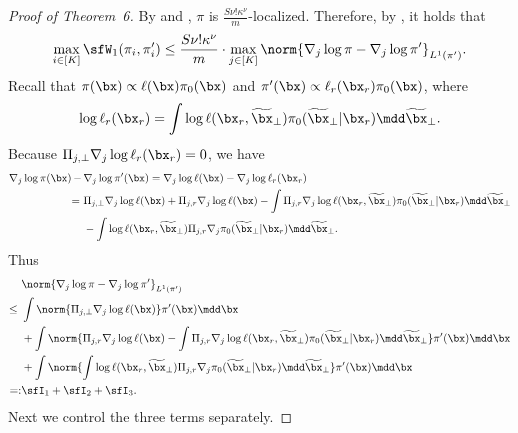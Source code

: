 \documentclass[11pt]{article}
\begin{document}
\begin{proof}[Proof of Theorem~6]

By  and , $\pi$ is $\frac{S\nu! \kappa^\nu}{m}$-localized.
Therefore, by , it holds that 
\[
    \max_{i \in [K]} \sfW_1(\pi_i,\pi_i') \le \frac{S\nu! \kappa^\nu}{m} \cdot \max_{j \in [K]} \norm{ \nabla_j \log \pi - \nabla_j \log \pi' }_{L^1(\pi')}.
\]
Recall that $\pi(\bx) \propto \ell(\bx) \pi_0(\bx)$ and $\pi'(\bx) \propto \ell_r(\bx_r) \pi_0(\bx)$, where
\[
    \log \ell_r(\bx_r) = \int \log \ell(\bx_r,\widetilde{\bx}_\bot) \pi_0(\widetilde{\bx}_\bot|\bx_r) \mdd \widetilde{\bx}_\bot.
\]
Because $\Pi_{j,\bot}\nabla_j \log \ell_r(\bx_r)=0$, we have
\begin{align*}
    \nabla_j \log \pi (\bx) \,-\, &\nabla_j \log \pi' (\bx) = \nabla_j \log \ell (\bx) - \nabla_j \log \ell_r (\bx_r) \\
    =~& \Pi_{j,\bot} \nabla_j \log \ell (\bx) + \Pi_{j,r} \nabla_j \log \ell (\bx) - \int \Pi_{j,r} \nabla_j \log \ell(\bx_r,\widetilde{\bx}_\bot) \pi_0(\widetilde{\bx}_\bot|\bx_r) \mdd \widetilde{\bx}_\bot \\
    &- \int \log \ell(\bx_r,\widetilde{\bx}_\bot) \Pi_{j,r} \nabla_j \pi_0(\widetilde{\bx}_\bot|\bx_r) \mdd \widetilde{\bx}_\bot. 
\end{align*}
Thus
\begin{equation}
\label{eqn:pf_LLIS_err_decomp}
\begin{split}
    &\norm{ \nabla_j \log \pi - \nabla_j \log \pi' }_{L^1(\pi')} \\
    \le~& \int \norm{ \Pi_{j,\bot} \nabla_j \log \ell (\bx) } \pi'(\bx) \mdd \bx \\
    &+ \int \norm{ \Pi_{j,r} \nabla_j \log \ell (\bx) - \int \Pi_{j,r} \nabla_j \log \ell(\bx_r,\widetilde{\bx}_\bot) \pi_0(\widetilde{\bx}_\bot|\bx_r) \mdd \widetilde{\bx}_\bot } \pi'(\bx) \mdd \bx \\
    &+ \int \norm{ \int \log \ell(\bx_r,\widetilde{\bx}_\bot) \Pi_{j,r} \nabla_j \pi_0(\widetilde{\bx}_\bot|\bx_r) \mdd \widetilde{\bx}_\bot } \pi'(\bx) \mdd \bx \\
    =:& \sfI_1 + \sfI_2 + \sfI_3.
\end{split}
\end{equation}
Next we control the three terms separately.


\end{proof}
\end{document}
